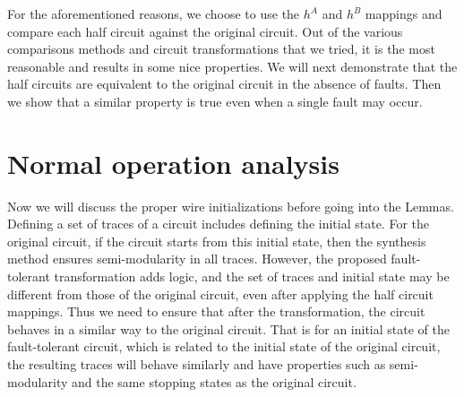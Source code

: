 \documentclass[12pt]{report}
\begin{document}
For the aforementioned reasons, we choose to use the $h^A$ and $h^B$ mappings and compare each half circuit against the original circuit.  Out of the various comparisons methods and circuit transformations that we tried, it is the most reasonable and results in some nice properties.  We will next demonstrate that the half circuits are equivalent to the original circuit in the absence of faults.  Then we show that a similar property is true even when a single fault may occur.

\section{Normal operation analysis}
Now we will discuss the proper wire initializations before going into the Lemmas.  Defining a set of traces of a circuit includes defining the initial state.  For the original circuit, if the circuit starts from this initial state, then the synthesis method ensures semi-modularity in all traces.  However, the proposed fault-tolerant transformation adds logic, and the set of traces and initial state may be different from those of the original circuit, even after applying the half circuit mappings.  Thus we need to ensure that after the transformation, the circuit behaves in a similar way to the original circuit.  That is for an initial state of the fault-tolerant circuit, which is related to the initial state of the original circuit, the resulting traces will behave similarly and have properties such as semi-modularity and the same stopping states as the original circuit. \\

\end{document}
